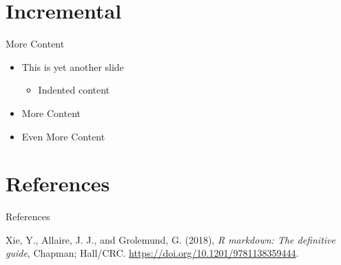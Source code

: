\documentclass[
  11pt,
  ignorenonframetext,
]{beamer}
\newlength{\cslhangindent}
\newenvironment{CSLReferences}[2] %
 {\begin{list}{}{%
  \setlength{\itemindent}{0pt}
  \setlength{\leftmargin}{0pt}
  \setlength{\parsep}{0pt}
  \ifodd #1
   \setlength{\leftmargin}{\cslhangindent}
   \setlength{\itemindent}{-1\cslhangindent}
  \fi
  \setlength{\itemsep}{#2\baselineskip}}}
 {\end{list}}
\providecommand{\tightlist}{%
  \setlength{\itemsep}{0pt}\setlength{\parskip}{0pt}}
\begin{document}
\section{Incremental}\label{incremental}

\begin{frame}{More Content}
\label{more-content}
\begin{itemize}
\tightlist
\item
  This is yet another slide

  \begin{itemize}
  \tightlist
  \item
    Indented content
  \end{itemize}
\end{itemize}

\pause

\begin{itemize}
\tightlist
\item
  More Content
\end{itemize}

\pause

\begin{itemize}
\tightlist
\item
  Even More Content
\end{itemize}
\end{frame}

\section{References}\label{references}

\begin{frame}[allowframebreaks]{References}
\label{references-1}
\label{refs}
\begin{CSLReferences}{1}{0}
Xie, Y., Allaire, J. J., and Grolemund, G. (2018), \emph{R markdown: The
definitive guide}, Chapman; Hall/CRC.
\url{https://doi.org/10.1201/9781138359444}.

\end{CSLReferences}
\end{frame}
\end{document}
